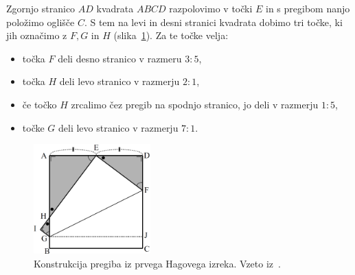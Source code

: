 \begin{izrek}
    Zgornjo stranico $AD$ kvadrata $ABCD$ razpolovimo v točki $E$ in s pregibom nanjo položimo oglišče $C$. S tem na levi in desni stranici kvadrata dobimo tri točke, ki jih označimo z $F, G$ in $H$ (slika~\ref{fig:hagov_izrek1}). Za te točke velja:
    \begin{itemize}
        \item točka $F$ deli desno stranico v razmeru $3:5$,
        \item točka $H$ deli levo stranico v razmerju $2:1$,
        \item če točko $H$ zrcalimo čez pregib na spodnjo stranico, jo deli v razmerju $1:5$,
        \item točke $G$ deli levo stranico v razmerju $7:1$.
    \end{itemize}
\end{izrek}

\begin{figure}[h]
    \centering
    \includegraphics[width=0.4\textwidth]{images/hagovi_izreki/hagov_izrek1.png}
    \caption[Pregib iz prvega Hagovega izreka]{Konstrukcija pregiba iz prvega Hagovega izreka. Vzeto iz~\cite[str. 4]{haga2008}.}
    \label{fig:hagov_izrek1}
\end{figure}

